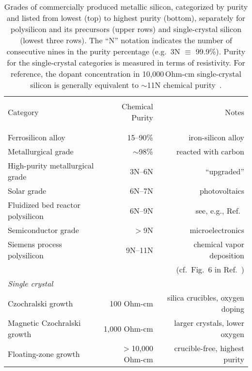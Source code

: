 \documentclass[final,5p]{elsarticle}
\begin{document}
\begin{table*}[ht]
\small
\begin{center}
\begin{tabular}{ l r r }
\hline 
 & & \\[-1em]
Category & Chemical Purity & Notes\\
 & & \\[-1em]
\hline
 & & \\[-1em]
Ferrosilicon alloy & 15--90\% & iron-silicon alloy \cite{ferrohandbook} \\
Metallurgical grade & $\sim$98\% & reacted with carbon \\
High-purity metallurgical grade & 3N--6N & ``upgraded'' \cite{metallurgic}\\
Solar grade & 6N--7N & photovoltaics \cite{braga}\\
Fluidized bed reactor polysilicon & 6N--9N & see, e.g., Ref.\ \cite{FBR} \\
Semiconductor grade & $>$9N & microelectronics\\
Siemens process  polysilicon & 9N--11N & chemical vapor deposition\\
& & (cf.\ Fig.\ 6 in Ref.\ \cite{metallurgic}) \\[-0.5em]
\textit{Single crystal} &  &  \\
\quad Czochralski growth & 100 Ohm-cm & silica crucibles, oxygen doping \cite{cz} \\
\quad Magnetic Czochralski growth & 1,000 Ohm-cm & larger crystals, lower oxygen \cite{mcz} \\
\quad Floating-zone growth & $>$10,000 Ohm-cm & crucible-free, highest purity \cite{fz} \\
\hline
\end{tabular}
\end{center}
\caption{\small Grades of commercially produced metallic silicon, categorized by purity and listed from lowest (top) to highest purity (bottom), separately for polysilicon and its precursors (upper rows) and single-crystal silicon (lowest three rows). The ``N'' notation indicates the number of consecutive nines in the purity percentage (e.g.\ 3N $\equiv$ 99.9\%). Purity for the single-crystal categories is measured in terms of resistivity. For reference, the dopant concentration in 10,000\,Ohm-cm single-crystal silicon is generally equivalent to $\sim$11N chemical purity~\cite{hull}.}
\label{tab:grades}
\end{table*}
\end{document}
